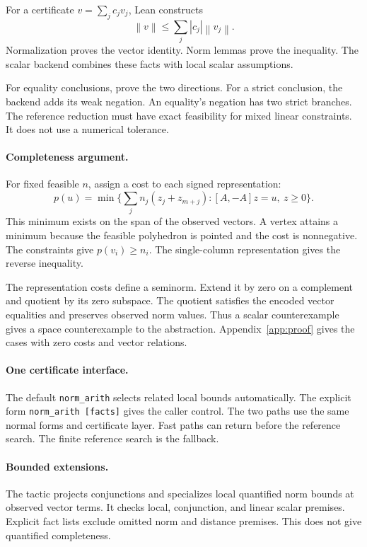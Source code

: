 \documentclass{article}
\newcommand{\norm}[1]{\left\lVert#1\right\rVert}
\newcommand{\NA}{\texttt{norm\_arith}}
\begin{document}
For a certificate $v=\sum_j c_jv_j$, Lean constructs
\begin{equation}\label{eq:certificate}
 \norm{v}\le\sum_j |c_j|\norm{v_j}.
\end{equation}
Normalization proves the vector identity.
Norm lemmas prove the inequality.
The scalar backend combines these facts with local scalar assumptions.

For equality conclusions, prove the two directions.
For a strict conclusion, the backend adds its weak negation.
An equality's negation has two strict branches.
The reference reduction must have exact feasibility for mixed linear constraints.
It does not use a numerical tolerance.

\paragraph{Completeness argument.}
For fixed feasible $n$, assign a cost to each signed representation:
\begin{equation}\label{eq:gauge}
 p(u)=\min\{\textstyle\sum_j n_j(z_j+z_{m+j}):[A,-A]z=u,\ z\ge0\}.
\end{equation}
This minimum exists on the span of the observed vectors.
A vertex attains a minimum because the feasible polyhedron is pointed and the cost is nonnegative.
The constraints give $p(v_i)\ge n_i$.
The single-column representation gives the reverse inequality.

The representation costs define a seminorm.
Extend it by zero on a complement and quotient by its zero subspace.
The quotient satisfies the encoded vector equalities and preserves observed norm values.
Thus a scalar counterexample gives a space counterexample to the abstraction.
Appendix~\ref{app:proof} gives the cases with zero costs and vector relations.

\paragraph{One certificate interface.}
The default \NA{} selects related local bounds automatically.
The explicit form \texttt{norm\_arith [facts]} gives the caller control.
The two paths use the same normal forms and certificate layer.
Fast paths can return before the reference search.
The finite reference search is the fallback.

\paragraph{Bounded extensions.}
The tactic projects conjunctions and specializes local quantified norm bounds at observed vector terms.
It checks local, conjunction, and linear scalar premises.
Explicit fact lists exclude omitted norm and distance premises.
This does not give quantified completeness.
\end{document}

